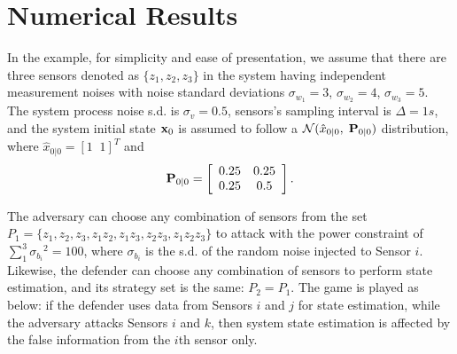 \documentclass{article}
\begin{document}
\section{Numerical Results}
\label{sec:numerical}
In the example, for simplicity and ease of presentation, we assume that  there are three  sensors denoted as $\{z_1, z_2, z_3\}$ in the system having  independent measurement noises with   noise standard deviations    $\sigma_{w_1}=3$, $\sigma_{w_2}=4$, $\sigma_{w_3}=5$. The system process noise s.d. is  $\sigma_v=0.5$, sensors's sampling interval is $\Delta=1s$, and the system initial state ${\bf x}_0$ is assumed to follow a ${\cal N}(\hat{x}_{0|0},\; {\bf P}_{0|0})$ distribution, where $\hat{x}_{0|0}= [1\;\;1]^T$ and  
 \[ {\bf P}_{0|0}=\left[\begin{array}{cc}
 0.25 &0.25\\0.25 &0.5 \end{array}\right].\]
 
  The adversary  can choose any combination of sensors from the set  $ P_1=\{z_1,z_2,z_3, z_1z_2, z_1z_3, z_2z_3,z_1z_2z_3\}$ to attack with the power constraint of $\sum_{1}^{3}{\sigma_{b_i}}^2=100$, where $\sigma_{b_i}$  is the s.d. of the random noise injected to Sensor $i$.  Likewise,   the defender can choose any combination of sensors to perform  state estimation, and its  strategy set is the same: $P_2=P_1$. The game is played as below: if the defender uses data from Sensors $i$ and $j$ for state estimation, while the adversary attacks Sensors $i$ and $k$, then  system state estimation is affected by the false information from the $i$th sensor only. 
 
\end{document}

